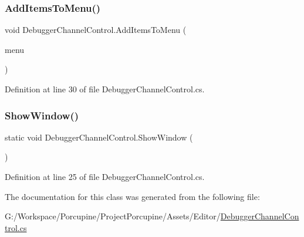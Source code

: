 \subsubsection{\texorpdfstring{Add\+Items\+To\+Menu()}{AddItemsToMenu()}}
{\footnotesize\ttfamily void Debugger\+Channel\+Control.\+Add\+Items\+To\+Menu (\begin{DoxyParamCaption}\item[{Generic\+Menu}]{menu }\end{DoxyParamCaption})}



Definition at line 30 of file Debugger\+Channel\+Control.\+cs.

\mbox{\label{class_debugger_channel_control_acf1e30aca1fdc865dc6ff648c558c4c9}} 
\subsubsection{\texorpdfstring{Show\+Window()}{ShowWindow()}}
{\footnotesize\ttfamily static void Debugger\+Channel\+Control.\+Show\+Window (\begin{DoxyParamCaption}{ }\end{DoxyParamCaption})\hspace{0.3cm}{\ttfamily [static]}}



Definition at line 25 of file Debugger\+Channel\+Control.\+cs.



The documentation for this class was generated from the following file\+:\begin{DoxyCompactItemize}
\item 
G\+:/\+Workspace/\+Porcupine/\+Project\+Porcupine/\+Assets/\+Editor/\hyperlink{_debugger_channel_control_8cs}{Debugger\+Channel\+Control.\+cs}\end{DoxyCompactItemize}

